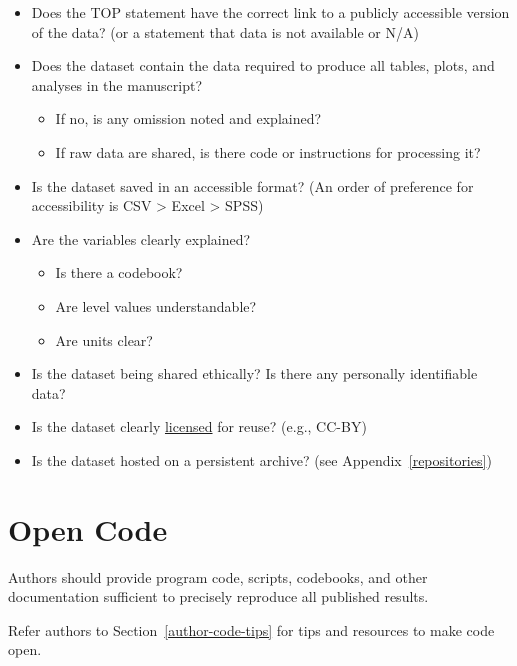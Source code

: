 \documentclass[
  oneside]{book}
\providecommand{\tightlist}{%
  \setlength{\itemsep}{0pt}\setlength{\parskip}{0pt}}
\begin{document}
\begin{itemize}
\tightlist
\item
  Does the TOP statement have the correct link to a publicly accessible version of the data? (or a statement that data is not available or N/A)
\item
  Does the dataset contain the data required to produce all tables, plots, and analyses in the manuscript?

  \begin{itemize}
  \tightlist
  \item
    If no, is any omission noted and explained?
  \item
    If raw data are shared, is there code or instructions for processing it?
  \end{itemize}
\item
  Is the dataset saved in an accessible format? (An order of preference for accessibility is CSV \textgreater{} Excel \textgreater{} SPSS)
\item
  Are the variables clearly explained?

  \begin{itemize}
  \tightlist
  \item
    Is there a codebook?
  \item
    Are level values understandable?
  \item
    Are units clear?
  \end{itemize}
\item
  Is the dataset being shared ethically? Is there any personally identifiable data?
\item
  Is the dataset clearly \href{https://www.ucl.ac.uk/library/research-support/research-data-management/licenses-data-sharing-creative-commons}{licensed} for reuse? (e.g., CC-BY)
\item
  Is the dataset hosted on a persistent archive? (see Appendix~\ref{repositories})
\end{itemize}

\hypertarget{open-code}{%
\chapter{Open Code}\label{open-code}}

Authors should provide program code, scripts, codebooks, and other documentation sufficient to precisely reproduce all published results.

Refer authors to Section~\ref{author-code-tips} for tips and resources to make code open.
\end{document}
